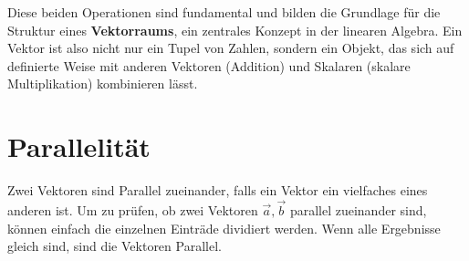 Diese beiden Operationen sind fundamental und bilden die Grundlage für die Struktur eines \textbf{Vektorraums}, ein zentrales Konzept in der linearen Algebra. Ein Vektor ist also nicht nur ein Tupel von Zahlen, sondern ein Objekt, das sich auf definierte Weise mit anderen Vektoren (Addition) und Skalaren (skalare Multiplikation) kombinieren lässt.

\section{Parallelität}

Zwei Vektoren sind Parallel zueinander, falls ein Vektor ein vielfaches eines anderen ist. Um zu prüfen, ob zwei Vektoren $\vec{a}, \vec{b}$ parallel zueinander sind, können einfach die einzelnen Einträde dividiert werden. Wenn alle Ergebnisse gleich sind, sind die Vektoren Parallel.